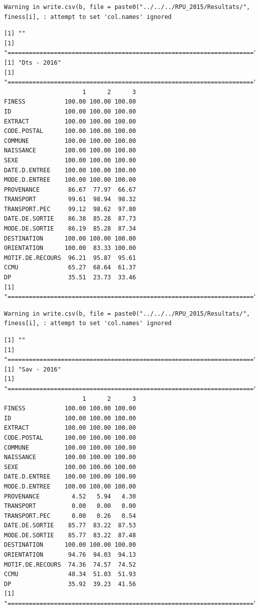 \documentclass[]{article}
\begin{document}
\begin{verbatim}
Warning in write.csv(b, file = paste0("../../../RPU_2015/Resultats/",
finess[i], : attempt to set 'col.names' ignored
\end{verbatim}

\begin{verbatim}
[1] ""
[1] "====================================================================="
[1] "Dts - 2016"
[1] "====================================================================="
                      1      2      3
FINESS           100.00 100.00 100.00
ID               100.00 100.00 100.00
EXTRACT          100.00 100.00 100.00
CODE.POSTAL      100.00 100.00 100.00
COMMUNE          100.00 100.00 100.00
NAISSANCE        100.00 100.00 100.00
SEXE             100.00 100.00 100.00
DATE.D.ENTREE    100.00 100.00 100.00
MODE.D.ENTREE    100.00 100.00 100.00
PROVENANCE        86.67  77.97  66.67
TRANSPORT         99.61  98.94  98.32
TRANSPORT.PEC     99.12  98.62  97.80
DATE.DE.SORTIE    86.38  85.28  87.73
MODE.DE.SORTIE    86.19  85.28  87.34
DESTINATION      100.00 100.00 100.00
ORIENTATION      100.00  83.33 100.00
MOTIF.DE.RECOURS  96.21  95.87  95.61
CCMU              65.27  68.64  61.37
DP                35.51  23.73  33.46
[1] "====================================================================="
\end{verbatim}

\begin{verbatim}
Warning in write.csv(b, file = paste0("../../../RPU_2015/Resultats/",
finess[i], : attempt to set 'col.names' ignored
\end{verbatim}

\begin{verbatim}
[1] ""
[1] "====================================================================="
[1] "Sav - 2016"
[1] "====================================================================="
                      1      2      3
FINESS           100.00 100.00 100.00
ID               100.00 100.00 100.00
EXTRACT          100.00 100.00 100.00
CODE.POSTAL      100.00 100.00 100.00
COMMUNE          100.00 100.00 100.00
NAISSANCE        100.00 100.00 100.00
SEXE             100.00 100.00 100.00
DATE.D.ENTREE    100.00 100.00 100.00
MODE.D.ENTREE    100.00 100.00 100.00
PROVENANCE         4.52   5.94   4.30
TRANSPORT          0.00   0.00   0.00
TRANSPORT.PEC      0.00   0.26   0.54
DATE.DE.SORTIE    85.77  83.22  87.53
MODE.DE.SORTIE    85.77  83.22  87.48
DESTINATION      100.00 100.00 100.00
ORIENTATION       94.76  94.03  94.13
MOTIF.DE.RECOURS  74.36  74.57  74.52
CCMU              48.34  51.03  51.93
DP                35.92  39.23  41.56
[1] "====================================================================="
\end{verbatim}
\end{document}
